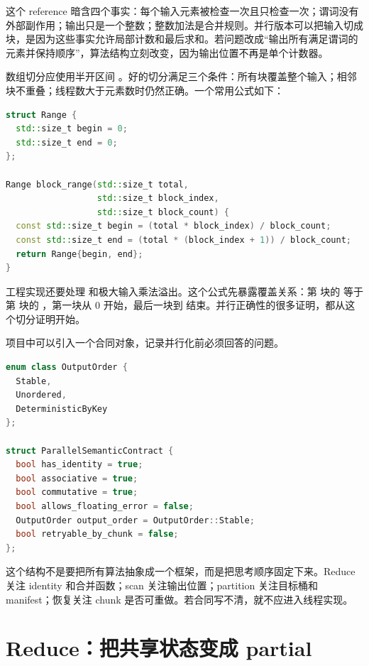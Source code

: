 这个 reference 暗含四个事实：每个输入元素被检查一次且只检查一次；谓词没有外部副作用；输出只是一个整数；整数加法是合并规则。并行版本可以把输入切成块，是因为这些事实允许局部计数和最后求和。若问题改成“输出所有满足谓词的元素并保持顺序”，算法结构立刻改变，因为输出位置不再是单个计数器。

数组切分应使用半开区间 \code{[begin, end)}。好的切分满足三个条件：所有块覆盖整个输入；相邻块不重叠；线程数大于元素数时仍然正确。一个常用公式如下：

\begin{lstlisting}[language=C++,caption={按块编号计算半开区间}]
struct Range {
  std::size_t begin = 0;
  std::size_t end = 0;
};

Range block_range(std::size_t total,
                  std::size_t block_index,
                  std::size_t block_count) {
  const std::size_t begin = (total * block_index) / block_count;
  const std::size_t end = (total * (block_index + 1)) / block_count;
  return Range{begin, end};
}
\end{lstlisting}

工程实现还要处理  和极大输入乘法溢出。这个公式先暴露覆盖关系：第  块的  等于第  块的 ，第一块从 0 开始，最后一块到  结束。并行正确性的很多证明，都从这个切分证明开始。

项目中可以引入一个合同对象，记录并行化前必须回答的问题。

\begin{lstlisting}[language=C++,caption={ParallelSemanticContract 的示例形态}]
enum class OutputOrder {
  Stable,
  Unordered,
  DeterministicByKey
};

struct ParallelSemanticContract {
  bool has_identity = true;
  bool associative = true;
  bool commutative = true;
  bool allows_floating_error = false;
  OutputOrder output_order = OutputOrder::Stable;
  bool retryable_by_chunk = false;
};
\end{lstlisting}

这个结构不是要把所有算法抽象成一个框架，而是把思考顺序固定下来。Reduce 关注 identity 和合并函数；scan 关注输出位置；partition 关注目标桶和 manifest；恢复关注 chunk 是否可重做。若合同写不清，就不应进入线程实现。

\section{Reduce：把共享状态变成 partial}

